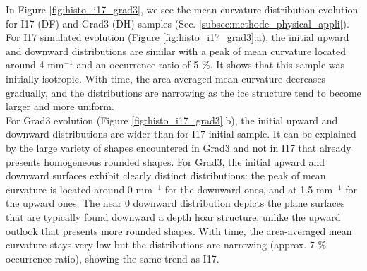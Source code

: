 \documentclass[draft,ms]{agujournal2019}
\begin{document}
In Figure \ref{fig:histo_i17_grad3}, we see the mean curvature distribution evolution for I17 (DF) and Grad3 (DH) samples (Sec. \ref{subsec:methode_physical_appli}).\\
For I17 simulated evolution (Figure \ref{fig:histo_i17_grad3}.a), the initial upward and downward distributions are similar with a peak of mean curvature located around 4 mm$^{-1}$ and an occurrence ratio of 5 \%. It shows that this sample was initially isotropic. With time, the area-averaged mean curvature decreases gradually, and the distributions are narrowing as the ice structure tend to become larger and more uniform.\\
For Grad3 evolution (Figure \ref{fig:histo_i17_grad3}.b), the initial upward and downward distributions are wider than for I17 initial sample. It can be explained by the large variety of shapes encountered in Grad3 and not in I17 that already presents homogeneous rounded shapes. For Grad3, the initial upward and downward surfaces exhibit clearly distinct distributions: the peak of mean curvature is located around 0 mm$^{-1}$ for the downward ones, and at 1.5 mm$^{-1}$ for the upward ones. The near 0 downward distribution depicts the plane surfaces that are typically found downward a depth hoar structure, unlike the upward outlook that presents more rounded shapes. With time, the area-averaged mean curvature stays very low but the distributions are narrowing (approx. 7 \% occurrence ratio), showing the same trend as I17.\\
\end{document}

